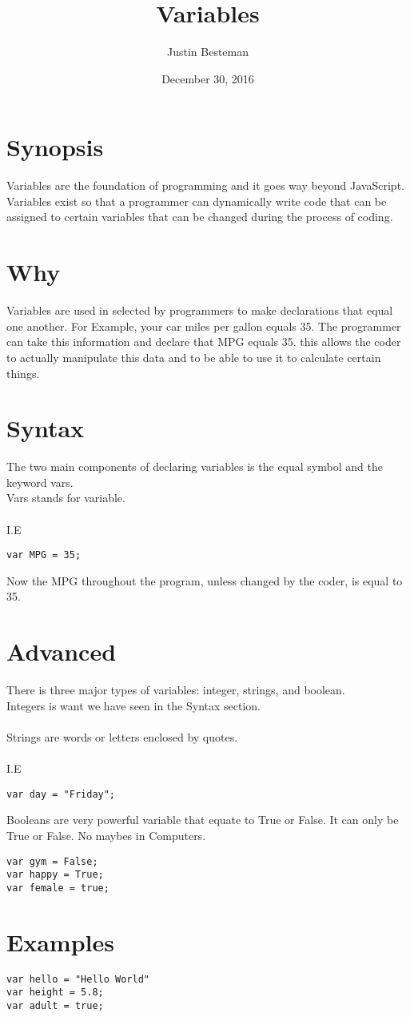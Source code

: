 \documentclass[12pt, letterpaper]{article}
\title{Variables}
\author{Justin Besteman}
\date{December 30, 2016}
\begin{document}
\maketitle


\section*{Synopsis}

	 Variables are the foundation of programming and it goes way beyond JavaScript. Variables exist so that a programmer can dynamically write code that can be assigned to certain variables that can be changed during the process of coding. 

\section*{Why}

Variables are used in selected by programmers to make declarations that equal one another.  For Example, your car miles per gallon equals 35. The programmer can take this information and declare that MPG equals 35.  this allows the coder to actually manipulate this data and to be able to use it to calculate certain things. 

\section*{Syntax}

The two main components of declaring variables is the equal symbol and the keyword vars.\\
Vars stands for variable. \\
\\
I.E 
\begin{lstlisting}
var MPG = 35;
\end{lstlisting}
Now the MPG throughout the program, unless changed by the coder, is equal to 35.

\section*{Advanced}

There is three major types of variables: integer, strings, and boolean.\\
Integers is want we have seen in the Syntax section.\\ \\
Strings are words or letters enclosed by quotes.\\ \\
I.E \\
\begin{lstlisting}
var day = "Friday";
\end{lstlisting}
Booleans are very powerful variable that equate to True or False. It can only be True or False. No maybes in Computers.

\begin{lstlisting}
var gym = False;
var happy = True;
var female = true;
\end{lstlisting}


\section*{Examples}

\begin{lstlisting}
var hello = "Hello World"
var height = 5.8;
var adult = true;
\end{lstlisting}
\end{document}
